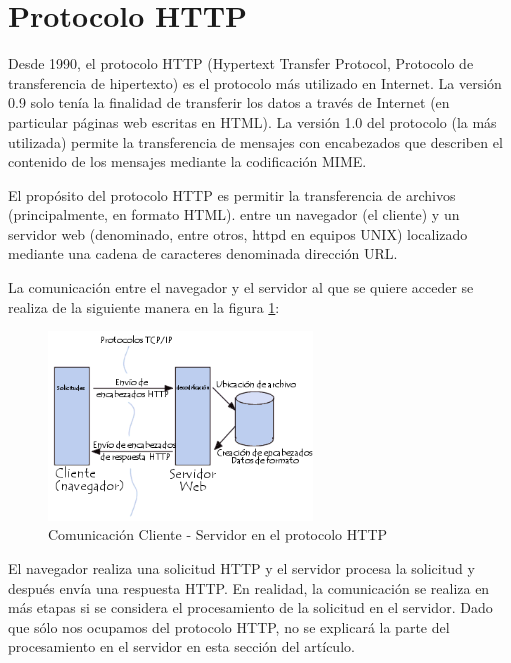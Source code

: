 \documentclass[12pt, a4paper, titlepage]{report}
\begin{document}
	    \section{Protocolo HTTP}
    	    Desde 1990, el protocolo HTTP (Hypertext Transfer Protocol, Protocolo de transferencia de hipertexto) es el protocolo más utilizado en Internet. La versión 0.9 solo tenía la finalidad de transferir los datos a través de Internet (en particular páginas web escritas en HTML). La versión 1.0 del protocolo (la más utilizada) permite la transferencia de mensajes con encabezados que describen el contenido de los mensajes mediante la codificación MIME.

            El propósito del protocolo HTTP es permitir la transferencia de archivos (principalmente, en formato HTML). entre un navegador (el cliente) y un servidor web (denominado, entre otros, httpd en equipos UNIX) localizado mediante una cadena de caracteres denominada dirección URL. 
            
            La comunicación entre el navegador y el servidor al que se quiere acceder se realiza de la siguiente manera en la figura \ref{fig:DiagramaHTTP}:
            \begin{figure}[H]
        			\begin{center}	                  \includegraphics[width=7cm]{./imagenes/MarcoTeorico/HTTPcs.png}
        				\caption{Comunicaci\'on Cliente - Servidor en el protocolo HTTP}
        				\label{fig:DiagramaHTTP}
        			\end{center}
        	\end{figure}
        	El navegador realiza una solicitud HTTP y el servidor procesa la solicitud y después envía una respuesta HTTP. En realidad, la comunicación se realiza en más etapas si se considera el procesamiento de la solicitud en el servidor. Dado que sólo nos ocupamos del protocolo HTTP, no se explicará la parte del procesamiento en el servidor en esta sección del artículo\cite{protocoloHTTP}. 
\end{document}
